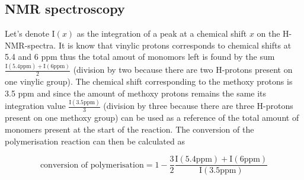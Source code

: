 \subsection{NMR spectroscopy}

Let's denote $\mathrm{I}(x)$ as the integration of a peak at a chemical shift $x$ on the H-NMR-spectra. 
It is know that vinylic protons corresponds to chemical shifts at 5.4 and 6 ppm thus the total amout of 
monomors left is found by the sum $\frac{\mathrm{I}(5.4\text{ppm})+\mathrm{I}(6\text{ppm})}{2}$ (division by two because there are two H-protons present on one vinylic group). The chemical shift corresponding to
the methoxy protons is 3.5 ppm and since the amount of methoxy protons remains the same its integration value $\frac{\mathrm{I}(3.5 \text{ppm})}{3}$  (division by three because there are three H-protons present on one methoxy group)
can be used as a reference of the total amount of monomers present at the start of the reaction. The conversion of the polymerisation reaction 
can then be calculated as

\begin{equation}
    \text{conversion of polymerisation} = 1 - \frac{3}{2}\frac{\mathrm{I}(5.4\text{ppm})+\mathrm{I}(6\text{ppm})}{\mathrm{I}(3.5 \text{ppm})}
    \label{convPoly}
\end{equation}
